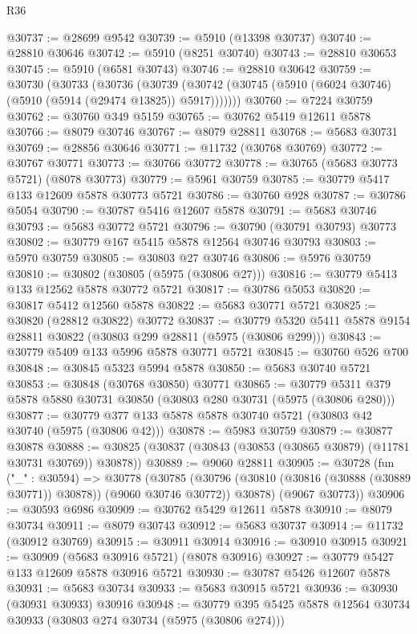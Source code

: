 \begin{lexlean}{R36}
\begin{coremodule}
@30737 := @28699 @9542
@30739 := @5910 (@13398 @30737)
@30740 := @28810 @30646
@30742 := @5910 (@8251 @30740)
@30743 := @28810 @30653
@30745 := @5910 (@6581 @30743)
@30746 := @28810 @30642
@30759 := @30730
    (@30733
      (@30736
        (@30739 (@30742 (@30745 (@5910 (@6024 @30746) (@5910 (@5914 (@29474 @13825)) @5917)))))))
@30760 := @7224 @30759
@30762 := @30760 @349 @5159
@30765 := @30762 @5419 @12611 @5878
@30766 := @8079 @30746
@30767 := @8079 @28811
@30768 := @5683 @30731
@30769 := @28856 @30646
@30771 := @11732 (@30768 @30769)
@30772 := @30767 @30771
@30773 := @30766 @30772
@30778 := @30765 (@5683 @30773 @5721) (@8078 @30773)
@30779 := @5961 @30759
@30785 := @30779 @5417 @133 @12609 @5878 @30773 @5721
@30786 := @30760 @928
@30787 := @30786 @5054
@30790 := @30787 @5416 @12607 @5878
@30791 := @5683 @30746
@30793 := @5683 @30772 @5721
@30796 := @30790 (@30791 @30793) @30773
@30802 := @30779 @167 @5415 @5878 @12564 @30746 @30793
@30803 := @5970 @30759
@30805 := @30803 @27 @30746
@30806 := @5976 @30759
@30810 := @30802 (@30805 (@5975 (@30806 @27)))
@30816 := @30779 @5413 @133 @12562 @5878 @30772 @5721
@30817 := @30786 @5053
@30820 := @30817 @5412 @12560 @5878
@30822 := @5683 @30771 @5721
@30825 := @30820 (@28812 @30822) @30772
@30837 := @30779 @5320 @5411 @5878 @9154 @28811 @30822 (@30803 @299 @28811 (@5975 (@30806 @299)))
@30843 := @30779 @5409 @133 @5996 @5878 @30771 @5721
@30845 := @30760 @526 @700
@30848 := @30845 @5323 @5994 @5878
@30850 := @5683 @30740 @5721
@30853 := @30848 (@30768 @30850) @30771
@30865 := @30779 @5311 @379 @5878 @5880 @30731 @30850 (@30803 @280 @30731 (@5975 (@30806 @280)))
@30877 := @30779 @377 @133 @5878 @5878 @30740 @5721 (@30803 @42 @30740 (@5975 (@30806 @42)))
@30878 := @5983 @30759
@30879 := @30877 @30878
@30888 := @30825 (@30837 (@30843 (@30853 (@30865 @30879) (@11781 @30731 @30769)) @30878))
@30889 := @9060 @28811
@30905 := @30728
    (fun ("_" : @30594) =>
    @30778
      (@30785
        (@30796 (@30810 (@30816 (@30888 (@30889 @30771)) @30878)) (@9060 @30746 @30772))
        @30878)
      (@9067 @30773))
@30906 := @30593 @6986
@30909 := @30762 @5429 @12611 @5878
@30910 := @8079 @30734
@30911 := @8079 @30743
@30912 := @5683 @30737
@30914 := @11732 (@30912 @30769)
@30915 := @30911 @30914
@30916 := @30910 @30915
@30921 := @30909 (@5683 @30916 @5721) (@8078 @30916)
@30927 := @30779 @5427 @133 @12609 @5878 @30916 @5721
@30930 := @30787 @5426 @12607 @5878
@30931 := @5683 @30734
@30933 := @5683 @30915 @5721
@30936 := @30930 (@30931 @30933) @30916
@30948 := @30779 @395 @5425 @5878 @12564 @30734 @30933 (@30803 @274 @30734 (@5975 (@30806 @274)))

\end{coremodule}
\end{lexlean}

